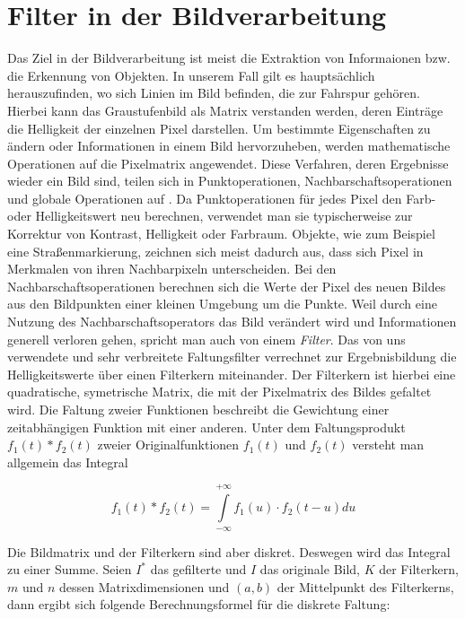\section{Filter in der Bildverarbeitung}

Das Ziel in der Bildverarbeitung ist meist die Extraktion von Informaionen bzw. die Erkennung von Objekten. In unserem Fall gilt es hauptsächlich herauszufinden, wo sich Linien im Bild befinden, die zur Fahrspur gehören. Hierbei kann das Graustufenbild als Matrix verstanden werden, deren Einträge die Helligkeit der einzelnen Pixel darstellen. Um bestimmte Eigenschaften zu ändern oder Informationen in einem Bild hervorzuheben, werden mathematische Operationen auf die Pixelmatrix angewendet. Diese Verfahren, deren Ergebnisse wieder ein Bild sind, teilen sich in Punktoperationen, Nachbarschaftsoperationen und globale Operationen auf \autocite{jaehneDigitaleBildverarbeitungMit2005}. Da Punktoperationen für jedes Pixel den Farb- oder Helligkeitswert neu berechnen, verwendet man sie typischerweise zur Korrektur von Kontrast, Helligkeit oder Farbraum. Objekte, wie zum Beispiel eine Straßenmarkierung, zeichnen sich meist dadurch aus, dass sich Pixel in Merkmalen von ihren Nachbarpixeln unterscheiden. Bei den Nachbarschaftsoperationen berechnen sich die Werte der Pixel des neuen Bildes aus den Bildpunkten einer kleinen Umgebung um die Punkte. Weil durch eine Nutzung des Nachbarschaftsoperators das Bild verändert wird und Informationen generell verloren gehen, spricht man auch von einem \emph{Filter}. Das von uns verwendete und sehr verbreitete Faltungsfilter verrechnet zur Ergebnisbildung die Helligkeitswerte über einen Filterkern miteinander. Der Filterkern ist hierbei eine quadratische, symetrische Matrix, die mit der Pixelmatrix des Bildes gefaltet wird. Die Faltung zweier Funktionen beschreibt die Gewichtung einer zeitabhängigen Funktion mit einer anderen. Unter dem Faltungsprodukt \( f_1(t) \ast f_2(t) \) zweier Originalfunktionen \(f_1(t) \) und \(f_2(t) \) versteht man allgemein das Integral \autocite{papulaMathematikFuerIngenieure}

\begin{equation}
f_1(t) \ast f_2(t) = \int \limits_{-\infty}^{+\infty} f_1(u) \cdot f_2(t-u)du
\end{equation}

 Die Bildmatrix und der Filterkern sind aber diskret. Deswegen wird das Integral zu einer Summe. Seien \( I^{\ast} \) das gefilterte und \( I \) das originale Bild, \(K\) der Filterkern, \(m\) und \(n\) dessen Matrixdimensionen und \( (a,b) \) der Mittelpunkt des Filterkerns, dann ergibt sich folgende Berechnungsformel für die diskrete Faltung:

